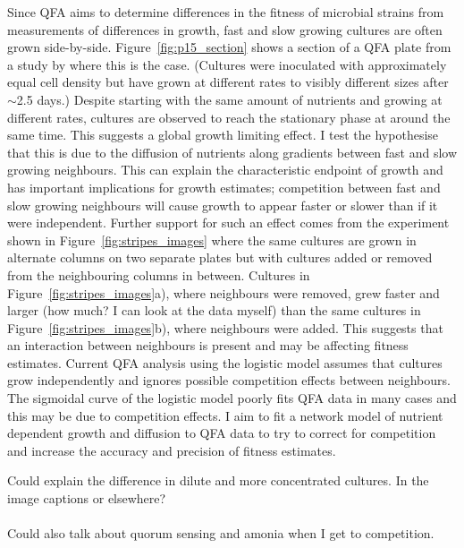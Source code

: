 Since QFA aims to determine differences in the fitness of microbial
strains from measurements of differences in growth, fast and slow
growing cultures are often grown
side-by-side. Figure~\ref{fig:p15_section} shows a section of a QFA
plate from a study by \citeauthor*{Addinall2011} where this is the
case. (Cultures were inoculated with approximately equal cell density
but have grown at different rates to visibly different sizes after
\(\sim\)2.5 days.) Despite starting with the same amount of nutrients
and growing at different rates, cultures are observed to reach the
stationary phase at around the same time. This suggests a global
growth limiting effect. I test the hypothesise that this is due to the
diffusion of nutrients along gradients between fast and slow growing
neighbours. This can explain the characteristic endpoint of growth and
has important implications for growth estimates; competition between
fast and slow growing neighbours will cause growth to appear faster or
slower than if it were independent. Further support for such an effect
comes from the experiment shown in Figure~\ref{fig:stripes_images}
where the same cultures are grown in alternate columns on two separate
plates but with cultures added or removed from the neighbouring
columns in between. Cultures in Figure~\ref{fig:stripes_images}a),
where neighbours were removed, grew faster and larger (how much? I can
look at the data myself) than the same cultures in
Figure~\ref{fig:stripes_images}b), where neighbours were added. This
suggests that an interaction between neighbours is present and may be
affecting fitness estimates. Current QFA analysis using the logistic
model assumes that cultures grow independently and ignores possible
competition effects between neighbours. The sigmoidal curve of the
logistic model poorly fits QFA data in many cases and this may be due
to competition effects. I aim to fit a network model of nutrient
dependent growth and diffusion to QFA data to try to correct for
competition and increase the accuracy and precision of fitness
estimates.

Could explain the difference in dilute and more concentrated
cultures. In the image captions or elsewhere?\\\\
Could also talk about quorum sensing and amonia when I get to
competition.


